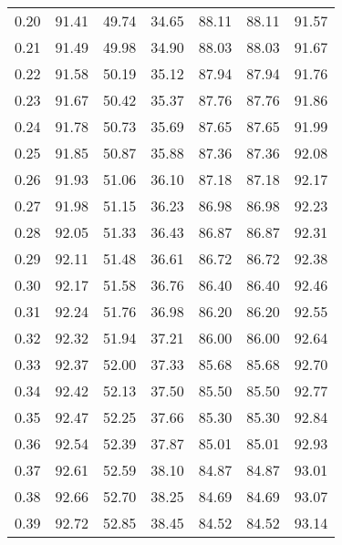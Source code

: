 \begin{tabular}{|c|c|c|c|c|c|c|}
      0.20 &     91.41 &     49.74 &      34.65 &   88.11 &      88.11 &         91.57 \\
      0.21 &     91.49 &     49.98 &      34.90 &   88.03 &      88.03 &         91.67 \\
      0.22 &     91.58 &     50.19 &      35.12 &   87.94 &      87.94 &         91.76 \\
      0.23 &     91.67 &     50.42 &      35.37 &   87.76 &      87.76 &         91.86 \\
      0.24 &     91.78 &     50.73 &      35.69 &   87.65 &      87.65 &         91.99 \\
      0.25 &     91.85 &     50.87 &      35.88 &   87.36 &      87.36 &         92.08 \\
      0.26 &     91.93 &     51.06 &      36.10 &   87.18 &      87.18 &         92.17 \\
      0.27 &     91.98 &     51.15 &      36.23 &   86.98 &      86.98 &         92.23 \\
      0.28 &     92.05 &     51.33 &      36.43 &   86.87 &      86.87 &         92.31 \\
      0.29 &     92.11 &     51.48 &      36.61 &   86.72 &      86.72 &         92.38 \\
      0.30 &     92.17 &     51.58 &      36.76 &   86.40 &      86.40 &         92.46 \\
      0.31 &     92.24 &     51.76 &      36.98 &   86.20 &      86.20 &         92.55 \\
      0.32 &     92.32 &     51.94 &      37.21 &   86.00 &      86.00 &         92.64 \\
      0.33 &     92.37 &     52.00 &      37.33 &   85.68 &      85.68 &         92.70 \\
      0.34 &     92.42 &     52.13 &      37.50 &   85.50 &      85.50 &         92.77 \\
      0.35 &     92.47 &     52.25 &      37.66 &   85.30 &      85.30 &         92.84 \\
      0.36 &     92.54 &     52.39 &      37.87 &   85.01 &      85.01 &         92.93 \\
      0.37 &     92.61 &     52.59 &      38.10 &   84.87 &      84.87 &         93.01 \\
      0.38 &     92.66 &     52.70 &      38.25 &   84.69 &      84.69 &         93.07 \\
      0.39 &     92.72 &     52.85 &      38.45 &   84.52 &      84.52 &         93.14 \\

\end{tabular}
